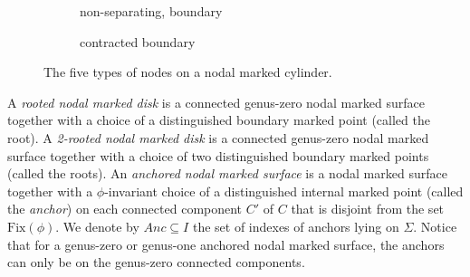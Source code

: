\documentclass[11pt]{amsart}
\theoremstyle{definition}
\theoremstyle{remark}
\newcommand{\<}{\left<}
\renewcommand{\>}{\right>}
\numberwithin{equation}{section}
\begin{document}
\begin{figure}[h]
\begin{subfigure}{.3\textwidth}
\vspace{0.15cm}

  \caption{non-separating, boundary}
\end{subfigure}
\begin{subfigure}{.3\textwidth}
  \centering

\vspace{0.15cm}

  \caption{contracted boundary }
\end{subfigure}





\caption{The five types of nodes on a nodal marked cylinder.}
\label{fig node type}
\end{figure}

A %
\textit{rooted nodal marked disk} is a connected genus-zero nodal marked surface together with a choice of a distinguished boundary marked point (called the root). A \textit{2-rooted nodal marked disk} is a connected genus-zero nodal marked surface together with a choice of two distinguished boundary marked points (called the roots). An \textit{anchored nodal marked surface} is a nodal marked surface together with a $\phi$-invariant choice of a distinguished internal marked point (called the \textit{anchor}) on each connected component $C'$ of $C$ that is disjoint from the set $\text{Fix}(\phi)$. We denote by $Anc\subseteq I$ the set of indexes of anchors lying on $\Sigma$. Notice that for a genus-zero or genus-one anchored nodal marked surface, the anchors can only be on the genus-zero connected components.
\end{document}
